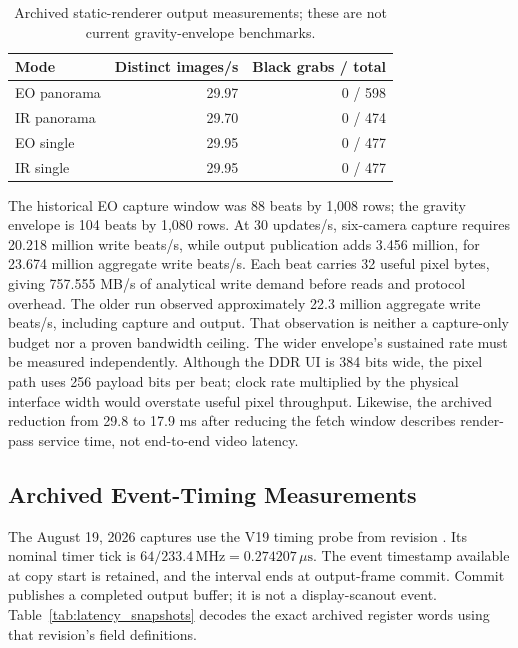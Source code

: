 \begin{table}[t]
\centering
\caption{Archived static-renderer output measurements; these are not current gravity-envelope benchmarks.}
\label{tab:historical_fps}
\small
\begin{tabular}{lrr}
\toprule
Mode & Distinct images/s & Black grabs / total \\
\midrule
EO panorama & 29.97 & 0 / 598 \\
IR panorama & 29.70 & 0 / 474 \\
EO single & 29.95 & 0 / 477 \\
IR single & 29.95 & 0 / 477 \\
\bottomrule
\end{tabular}
\end{table}

The historical EO capture window was 88 beats by 1,008 rows; the gravity envelope is 104 beats by 1,080 rows. At 30 updates/s, six-camera capture requires 20.218 million write beats/s, while output publication adds 3.456 million, for 23.674 million aggregate write beats/s. Each beat carries 32 useful pixel bytes, giving 757.555 MB/s of analytical write demand before reads and protocol overhead. The older run observed approximately 22.3 million aggregate write beats/s, including capture and output. That observation is neither a capture-only budget nor a proven bandwidth ceiling. The wider envelope's sustained rate must be measured independently. Although the DDR UI is 384 bits wide, the pixel path uses 256 payload bits per beat; clock rate multiplied by the physical interface width would overstate useful pixel throughput. Likewise, the archived reduction from 29.8 to 17.9 ms after reducing the fetch window describes render-pass service time, not end-to-end video latency.

\subsection{Archived Event-Timing Measurements}
The August 19, 2026 captures use the V19 timing probe from revision . Its nominal timer tick is $64/233.4\,\mathrm{MHz}=0.274207\,\mu\mathrm{s}$. The event timestamp available at copy start is retained, and the interval ends at output-frame commit. Commit publishes a completed output buffer; it is not a display-scanout event. Table~\ref{tab:latency_snapshots} decodes the exact archived register words using that revision's field definitions.

